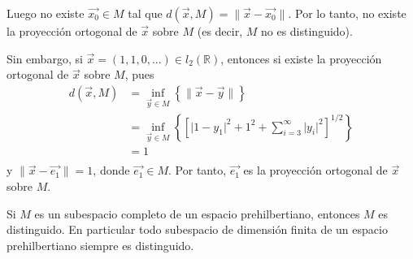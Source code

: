 \documentclass[12pt]{report}
\theoremstyle{largebreak}
\newcommand\abs[1]{\ensuremath{\big|#1\big|}}
\newcommand\norm[1]{\ensuremath{\|#1\|}}
\begin{document}
\begin{exa}
        Luego no existe $\vec{x_0}\in M$ tal que $d(\vec{x},M)=\norm{\vec{x}-\vec{x_0}}$. Por lo tanto, no existe la proyección ortogonal de $\vec{x}$ sobre $M$ (es decir, $M$ no es distinguido).

        Sin embargo, si $\vec{x}=(1,1,0,...)\in l_2(\mathbb{R})$, entonces si existe la proyección ortogonal de $\vec{x}$ sobre $M$, pues
        \begin{equation*}
            \begin{split}
                d(\vec{x},M)&=\inf_{\vec{y}\in M}\left\{\norm{\vec{x}-\vec{y}} \right\}\\
                &=\inf_{\vec{y}\in M}\left\{\left[\abs{1-y_1}^2+1^2+\sum_{i=3}^{\infty} \abs{y_i}^2 \right]^{1/2} \right\}\\
                &=1\\
            \end{split}
        \end{equation*}
        y $\norm{\vec{x}-\vec{e_1}}=1$, donde $\vec{e_1}\in M$. Por tanto, $\vec{e_1}$ es la proyección ortogonal de $\vec{x}$ sobre $M$.
    \end{exa}

    \begin{theor}
        Si $M$ es un subespacio completo de un espacio prehilbertiano, entonces $M$ es distinguido. En particular todo subespacio de dimensión finita de un espacio prehilbertiano siempre es distinguido. 
    \end{theor}
\end{document}
